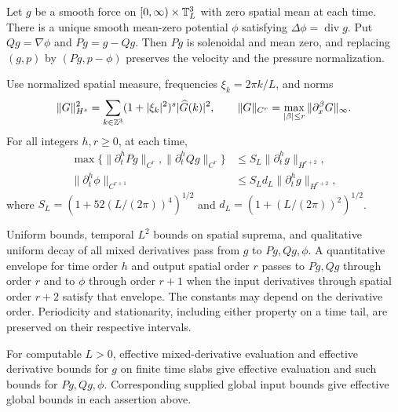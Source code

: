 \begin{proposition}\label{prop:projection-l2}
Let $g$ be a smooth force on $[0,\infty)\times\mathbb T_L^3$ with zero
spatial mean at each time. There is a unique smooth mean-zero potential
$\phi$ satisfying $\Delta\phi=\operatorname{div}g$. Put
$Qg=\nabla\phi$ and $Pg=g-Qg$. Then $Pg$ is solenoidal and mean zero,
and replacing $(g,p)$ by $(Pg,p-\phi)$ preserves the velocity and the
pressure normalization.

Use normalized spatial measure, frequencies $\xi_k=2\pi k/L$, and norms
\[
 \|G\|_{H^s}^2=\sum_{k\in\mathbb Z^3}(1+|\xi_k|^2)^s|\widehat G(k)|^2,
 \qquad
 \|G\|_{C^r}=\max_{|\beta|\le r}\|\partial_x^\beta G\|_\infty.
\]
For all integers $h,r\ge0$, at each time,
\begin{equation}\label{eq:projection-estimate}
 \begin{aligned}
 \max\{\|\partial_t^h Pg\|_{C^r},\|\partial_t^h Qg\|_{C^r}\}
     &\le S_L\|\partial_t^h g\|_{H^{r+2}},\\
 \|\partial_t^h\phi\|_{C^{r+1}}
     &\le S_Ld_L\|\partial_t^h g\|_{H^{r+2}},
 \end{aligned}
\end{equation}
where $S_L=(1+52(L/(2\pi))^4)^{1/2}$ and
$d_L=(1+(L/(2\pi))^2)^{1/2}$.

Uniform bounds, temporal $L^2$ bounds on spatial suprema, and qualitative
uniform decay of all mixed derivatives pass from $g$ to $Pg,Qg,\phi$.
A quantitative envelope for time order $h$ and output spatial order $r$
passes to $Pg,Qg$ through order $r$ and to $\phi$ through order $r+1$
when the input derivatives through spatial order $r+2$ satisfy that
envelope. The constants may depend on the derivative order.
Periodicity and stationarity, including either property on a time tail,
are preserved on their respective intervals.

For computable $L>0$, effective mixed-derivative evaluation and effective
derivative bounds for $g$ on finite time slabs give effective evaluation
and such bounds for $Pg,Qg,\phi$. Corresponding supplied global input
bounds give effective global bounds in each assertion above.
\end{proposition}
